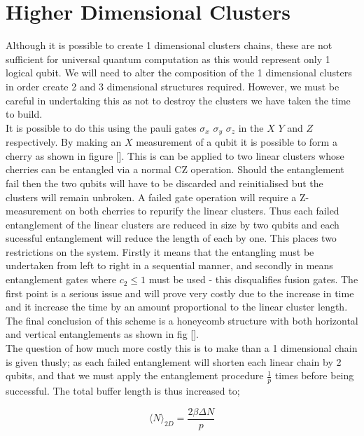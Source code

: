 \documentclass{article}
\numberwithin{equation}{section} %
\begin{document}
\section{Higher Dimensional Clusters}

Although it is possible to create 1 dimensional clusters chains, these are not sufficient for universal quantum computation as this would represent only 1 logical qubit. We will need to alter the composition of the 1 dimensional clusters in order create 2 and 3 dimensional structures required. However, we must be careful in undertaking this as not to destroy the clusters we have taken the time to build. \\ 

 It is possible to do this using the pauli gates $\sigma _x$ $\sigma _y$ $\sigma _z$ in the $X$ $Y$ and $Z$ respectively. By making an $X$ measurement of a qubit it is possible to form a cherry as shown in figure []. This is can be applied to two linear clusters whose cherries can be entangled via a normal CZ operation. Should the entanglement fail then the two qubits will have to be discarded and reinitialised but the clusters will remain unbroken. A failed gate operation will require a Z-measurement on both cherries to repurify the linear clusters. Thus each failed entanglement of the linear clusters are reduced in size by two qubits and each sucessful entanglement will reduce the length of each by one. This places two restrictions on the system. Firstly it means that the entangling must be undertaken from left to right in a sequential manner, and secondly in means entanglement gates where $c_2 \le 1$ must be used - this disqualifies fusion gates. The first point is a serious issue and will prove very costly due to the increase in time and it increase the time by an amount proportional to the linear cluster length. The final conclusion of this scheme is a honeycomb structure with both horizontal and vertical entanglements as shown in fig []. \\
 
 The question of how much more costly this is to make than a 1 dimensional chain is given thusly; as each failed entanglement will shorten each linear chain by 2 qubits, and that we must apply the entanglement procedure $\frac{1}{p}$ times before being successful. The total buffer length is thus increased to;
 
\begin{equation}
\langle N \rangle _{2D} =\frac{2\beta \Delta N}{p}
\end{equation}
   
\end{document}
